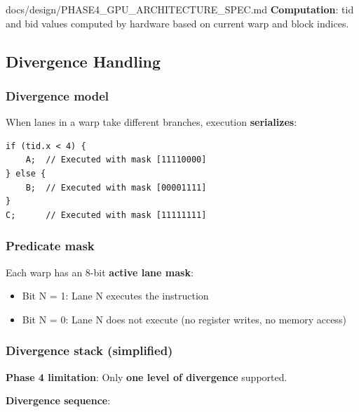 \begin{relocated}{docs/design/PHASE4_GPU_ARCHITECTURE_SPEC.md}
\textbf{Computation}: tid and bid values computed by hardware based on
current warp and block indices.

\subsection{Divergence Handling}\label{ds:ch:phase4-gpu-architecture:divergence-handling}

\subsubsection{Divergence model}\label{ds:ch:phase4-gpu-architecture:divergence-model}

When lanes in a warp take different branches, execution
\textbf{serializes}:

\begin{lstlisting}[language={}]
if (tid.x < 4) {
    A;  // Executed with mask [11110000]
} else {
    B;  // Executed with mask [00001111]
}
C;      // Executed with mask [11111111]
\end{lstlisting}

\subsubsection{Predicate mask}\label{ds:ch:phase4-gpu-architecture:predicate-mask}

Each warp has an 8-bit \textbf{active lane mask}:

\begin{itemize}
\tightlist
\item
  Bit N = 1: Lane N executes the instruction
\item
  Bit N = 0: Lane N does not execute (no register writes, no memory
  access)
\end{itemize}

\subsubsection{Divergence stack (simplified)}\label{ds:ch:phase4-gpu-architecture:divergence-stack-simplified}

\textbf{Phase 4 limitation}: Only \textbf{one level of divergence}
supported.

\textbf{Divergence sequence}:


\end{relocated}
